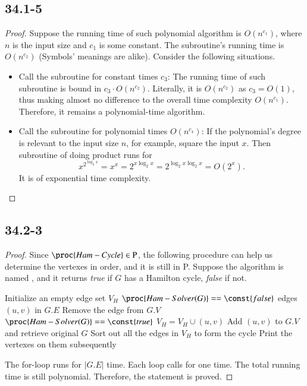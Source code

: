 \documentclass[twocolumn, 10.5pt]{article}
\begin{document}
	\subsection*{34.1-5}
	\begin{proof}
		Suppose the running time of such polynomial algorithm is $O(n^{c_1})$, where $n$ is the input size and $c_1$ is some constant. The subroutine's running time is $O(n^{c_2})$ (Symbols' meanings are alike). Consider the following situations.
		\begin{itemize}
			\item Call the subroutine for constant times $c_3$: The running time of such subroutine is bound in $c_3\cdot O(n^{c_2})$. Literally, it is $O(n^{c_2})$ as $c_3=O(1)$, thus making almost no difference to the overall time complexity $O(n^{c_1})$. Therefore, it remains a polynomial-time algorithm.
			\item Call the subroutine for polynomial times $O(n^{c_4})$:  If the polynomial's degree is relevant to the input size $n$, for example, square the input $x$. Then subroutine of doing product runs for $$x^{2^{\log_2 x}}=x^x=2^{x\log_2 x}=2^{\log_2 x{\log_2 x}}=O(2^x).$$
			It is of exponential time complexity.
		\end{itemize}
	\end{proof}
	\subsection*{34.2-3}
	\begin{proof}
		Since $\proc{Ham-Cycle}\in \text{P}$, the following procedure can help us determine the vertexes in order, and it is still in P. Suppose the algorithm is named , and it returns \emph{true} if $G$ has a Hamilton cycle, \emph{false} if not. 
		\begin{codebox}
			\zi
			\li
			Initialize an empty  edge set $V_H$\li
			\If $\proc{Ham-Solver(G)}==\const{false}$\li
			\Do \Return {}\End \li
			\Else\li\Do  
			\For edges  $(u,v)$ in $G.E$\li
			\Do Remove the edge from $G.V$\li 
			\If $\proc{Ham-Solver(G)}==\const{true}$\li 
			\Do $V_H=V_H\cup (u,v)$\End\li
			\End\End 
			Add $(u,v)$ to $G.V$ and retrieve original $G$\li 
			\End\End  
			Sort out all the edges in $V_H$ to form the cycle\li 
			Print the vertexes on them subsequently
		\end{codebox}
		The for-loop runs for $|G.E|$ time. Each loop calls  for one time. The total running time is still polynomial. Therefore, the statement is proved.
	\end{proof}
\end{document}
